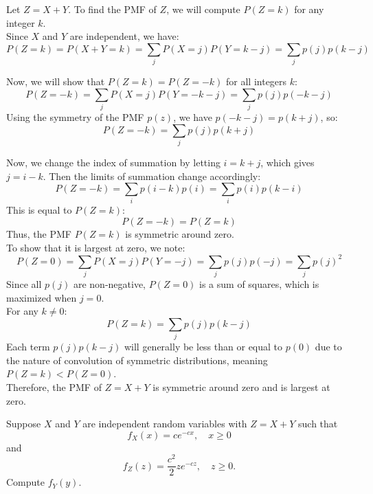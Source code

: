 \begin{solution}
    Let \( Z = X + Y \). To find the PMF of \( Z \), we will compute \( P(Z = k) \) for any integer \( k \).\\

    Since \( X \) and \( Y \) are independent, we have:
    \[
    P(Z = k) = P(X + Y = k) = \sum_{j} P(X = j) P(Y = k - j) = \sum_{j} p(j) p(k - j)
    \]

    Now, we will show that \( P(Z = k) = P(Z = -k) \) for all integers \( k \):
    \[
    P(Z = -k) = \sum_{j} P(X = j) P(Y = -k - j) = \sum_{j} p(j) p(-k - j)
    \]
    Using the symmetry of the PMF \( p(z) \), we have \( p(-k - j) = p(k + j) \), so:
    \[
    P(Z = -k) = \sum_{j} p(j) p(k + j)
    \]

    Now, we change the index of summation by letting \( i = k + j \), which gives \( j = i - k \). Then the limits of summation change accordingly:
    \[
    P(Z = -k) = \sum_{i} p(i - k) p(i) = \sum_{i} p(i) p(k - i)
    \]
    This is equal to \( P(Z = k) \):
    \[
    P(Z = -k) = P(Z = k)
    \]
    Thus, the PMF \( P(Z = k) \) is symmetric around zero.\\

    To show that it is largest at zero, we note:
    \[
    P(Z = 0) = \sum_{j} P(X = j) P(Y = -j) = \sum_{j} p(j) p(-j) = \sum_{j} p(j)^2
    \]
    Since all \( p(j) \) are non-negative, \( P(Z = 0) \) is a sum of squares, which is maximized when \( j = 0 \).\\

    For any \( k \neq 0 \):
    \[
    P(Z = k) = \sum_{j} p(j) p(k - j)
    \]
    Each term \( p(j) p(k - j) \) will generally be less than or equal to \( p(0) \) due to the nature of convolution of symmetric distributions, meaning \( P(Z = k) < P(Z = 0) \).\\

    Therefore, the PMF of \( Z = X + Y \) is symmetric around zero and is largest at zero.
\end{solution}

\begin{exercise}
    Suppose \( X \) and \( Y \) are independent random variables with \( Z = X + Y \) such that 
    \[
    f_X(x) = c e^{-cx}, \quad x \geq 0
    \]
    and 
    \[
    f_Z(z) = \frac{c^2}{2} z e^{-cz}, \quad z \geq 0.
    \]
    Compute \( f_Y(y) \).
\end{exercise}

